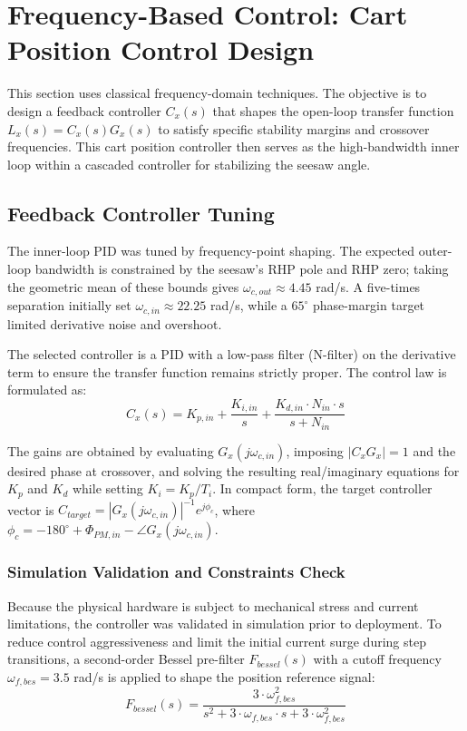 \documentclass[11pt,a4paper]{article}
\begin{document}
\section{Frequency-Based Control: Cart Position Control Design}\label{sec:freq_cart_pos_control}
This section uses classical frequency-domain techniques. The objective is to design a feedback controller $C_x(s)$ that shapes the open-loop transfer function $L_x(s) = C_x(s)G_x(s)$ to satisfy specific stability margins and crossover frequencies. This cart position controller then serves as the high-bandwidth inner loop within a cascaded controller for stabilizing the seesaw angle.

\subsection{Feedback Controller Tuning}\label{sub:cart_fb}
The inner-loop PID was tuned by frequency-point shaping. The expected outer-loop bandwidth is constrained by the seesaw's RHP pole and RHP zero; taking the geometric mean of these bounds gives $\omega_{c,out}\approx4.45$ rad/s. A five-times separation initially set $\omega_{c,in}\approx22.25$ rad/s, while a $65^\circ$ phase-margin target limited derivative noise and overshoot.

The selected controller is a PID with a low-pass filter (N-filter) on the derivative term to ensure the transfer function remains strictly proper. The control law is formulated as:
\begin{equation}
C_x(s) = K_{p,in} + \frac{K_{i,in}}{s} + \frac{K_{d,in} \cdot N_{in} \cdot s}{s + N_{in}}
\label{eq:pid_inner}
\end{equation}

The gains are obtained by evaluating $G_x(j\omega_{c,in})$, imposing $|C_xG_x|=1$ and the desired phase at crossover, and solving the resulting real/imaginary equations for $K_p$ and $K_d$ while setting $K_i=K_p/T_i$. In compact form, the target controller vector is $C_{target}=|G_x(j\omega_{c,in})|^{-1}e^{j\phi_c}$, where $\phi_c=-180^\circ+\Phi_{PM,in}-\angle G_x(j\omega_{c,in})$.

\subsubsection{Simulation Validation and Constraints Check}\label{subsub:cart_constraints}
Because the physical hardware is subject to mechanical stress and current limitations, the controller was validated in simulation prior to deployment. To reduce control aggressiveness and limit the initial current surge during step transitions, a second-order Bessel pre-filter $F_{bessel}(s)$ with a cutoff frequency $\omega_{f,bes} = 3.5$ rad/s is applied to shape the position reference signal:
\begin{equation}
F_{bessel}(s) = \frac{3 \cdot \omega_{f,bes}^2}{s^2 + 3 \cdot \omega_{f,bes} \cdot s + 3 \cdot \omega_{f,bes}^2}
\end{equation}
\end{document}
